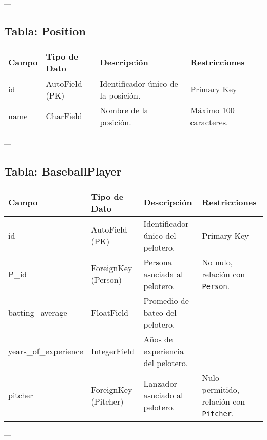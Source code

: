 \documentclass{report}
\begin{document}
    ---
    
    \subsection*{Tabla: Position}
    \begin{tabular}{|>{\raggedright\arraybackslash}p{3cm}|>{\raggedright\arraybackslash}p{3cm}|>{\raggedright\arraybackslash}p{6cm}|>{\raggedright\arraybackslash}p{4cm}|}
        \hline
        \textbf{Campo} & \textbf{Tipo de Dato} & \textbf{Descripción} & \textbf{Restricciones} \\
        \hline
        id & AutoField (PK) & Identificador único de la posición. & Primary Key \\
        \hline
        name & CharField & Nombre de la posición. & Máximo 100 caracteres. \\
        \hline
    \end{tabular}
    
    ---
    
    \subsection*{Tabla: BaseballPlayer}
    \begin{tabular}{|>{\raggedright\arraybackslash}p{3cm}|>{\raggedright\arraybackslash}p{3cm}|>{\raggedright\arraybackslash}p{6cm}|>{\raggedright\arraybackslash}p{4cm}|}
        \hline
        \textbf{Campo} & \textbf{Tipo de Dato} & \textbf{Descripción} & \textbf{Restricciones} \\
        \hline
        id & AutoField (PK) & Identificador único del pelotero. & Primary Key \\
        \hline
        P\_id & ForeignKey (Person) & Persona asociada al pelotero. & No nulo, relación con \texttt{Person}. \\
        \hline
        batting\_average & FloatField & Promedio de bateo del pelotero. &  \\
        \hline
        years\_of\_experience & IntegerField & Años de experiencia del pelotero. &  \\
        \hline
        pitcher & ForeignKey (Pitcher) & Lanzador asociado al pelotero. & Nulo permitido, relación con \texttt{Pitcher}. \\
        \hline
    \end{tabular}
    
    ---
    
\end{document}
